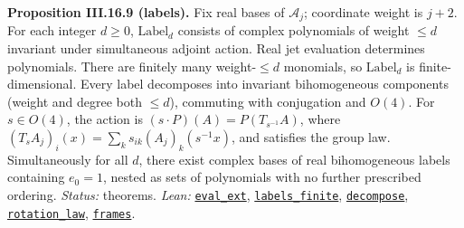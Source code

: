 \documentclass[
  letterpaper,
  11pt]{article}
\begin{document}
\textbf{Proposition III.16.9 (labels).} Fix real bases of
\(\mathcal A_j\); coordinate weight is \(j+2\). For each integer
\(d\ge0\), \(\mathrm{Label}_d\) consists of complex polynomials of
weight \(\le d\) invariant under simultaneous adjoint action. Real jet
evaluation determines polynomials. There are finitely many
weight-\(\le d\) monomials, so \(\mathrm{Label}_d\) is
finite-dimensional. Every label decomposes into invariant bihomogeneous
components (weight and degree both \(\le d\)), commuting with
conjugation and \(O(4)\). For \(s\in O(4)\), the action is
\((s\cdot P)(A)=P(T_{s^{-1}}A)\), where
\((T_sA_j)_i(x)=\sum_ks_{ik}(A_j)_k(s^{-1}x)\), and satisfies the group
law. Simultaneously for all \(d\), there exist complex bases of real
bihomogeneous labels containing \(e_0=1\), nested as sets of polynomials
with no further prescribed ordering. \emph{Status:} theorems.
\emph{Lean:}
\href{https://github.com/yang-mills-group/OpenAI-YM-20261028/blob/3456e5e75cf8d4cd558955a5c7638fba2d68f464/YM/Labels/Polynomial.lean\#L38-L49}{\texttt{eval\_ext}},
\href{https://github.com/yang-mills-group/OpenAI-YM-20261028/blob/3456e5e75cf8d4cd558955a5c7638fba2d68f464/YM/Labels/Polynomial.lean\#L114-L117}{\texttt{labels\_finite}},
\href{https://github.com/yang-mills-group/OpenAI-YM-20261028/blob/3456e5e75cf8d4cd558955a5c7638fba2d68f464/YM/Labels/Grading.lean\#L87-L105}{\texttt{decompose}},
\href{https://github.com/yang-mills-group/OpenAI-YM-20261028/blob/3456e5e75cf8d4cd558955a5c7638fba2d68f464/YM/Labels/Action.lean\#L82-L88}{\texttt{rotation\_law}},
\href{https://github.com/yang-mills-group/OpenAI-YM-20261028/blob/3456e5e75cf8d4cd558955a5c7638fba2d68f464/YM/Labels/Basis.lean\#L107-L111}{\texttt{frames}}.
\end{document}
